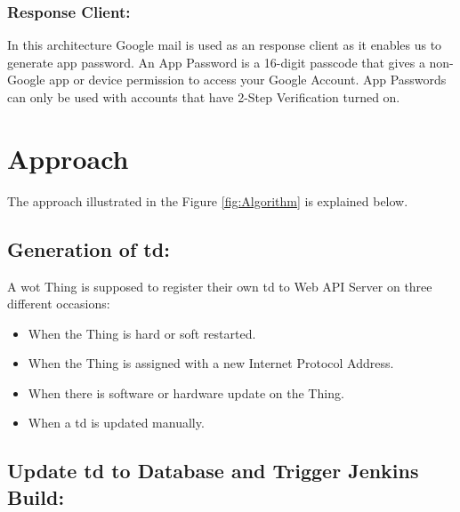 \documentclass[conference]{IEEEtran}
\theoremstyle{definition}
\begin{document}
\subsubsection{Response Client:}

In this architecture Google mail is used as an response client as it enables us to generate app password. 
An App Password is a 16-digit passcode that gives a non-Google app or device permission to access your Google Account. 
App Passwords can only be used with accounts that have 2-Step Verification turned on.

\section{Approach}

The approach illustrated in the Figure \ref{fig:Algorithm} is explained below.

\subsection{Generation of \ac{td}:}
  
A \ac{wot} Thing is supposed to register their own \ac{td} to Web API Server on three different occasions:

\begin{itemize}
\item When the Thing is hard or soft restarted.
\item When the Thing is assigned with a new Internet Protocol Address.
\item When there is software or hardware update on the Thing.
\item When a \ac{td} is updated manually.
\end{itemize}

\subsection{Update \ac{td} to Database and Trigger Jenkins Build:}
  
\end{document}
